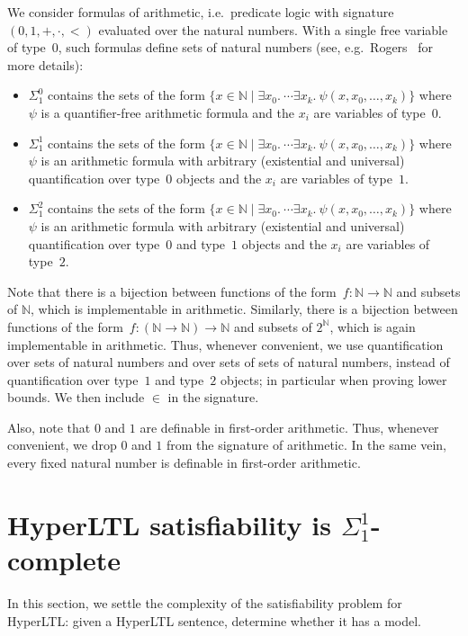 \documentclass[dvipsnames,10pt,a4paper]{amsart}
\theoremstyle{definition}
\theoremstyle{remark}
\newcommand{\set}[1]{\{#1\}}
\newcommand{\nats}{\mathbb{N}}
\newcommand{\pow}[1]{2^{#1}}
\newcommand{\hyltl}{{HyperLTL}\xspace}
\begin{document}
We consider formulas of arithmetic, i.e.\ predicate logic with signature~$(0,1, +, \cdot, <)$ evaluated over the natural numbers. With a single free variable of type~$0$, such formulas define sets of natural numbers (see, e.g.\ Rogers~\cite{Rogers87} for more details):
\begin{itemize}
	\item $\Sigma_1^0$ contains the sets of the form $\set{x \in \nats \mid \exists x_0.\  \cdots \exists x_k.\ \psi(x, x_0, \ldots, x_k)}$ where $\psi$ is a quantifier-free arithmetic formula and the $x_i$ are variables of type~$0$. 
	\item $\Sigma_1^1$ contains the sets of the form $\set{x \in \nats \mid \exists x_0.\  \cdots \exists x_k.\ \psi(x, x_0, \ldots, x_k)}$ where $\psi$ is an arithmetic formula with arbitrary (existential and universal) quantification over type~$0$ objects and the $x_i$ are variables of type~$1$. 
	\item $\Sigma_1^2$ contains the sets of the form $\set{x \in \nats \mid \exists x_0.\  \cdots \exists x_k.\ \psi(x, x_0, \ldots, x_k)}$ where $\psi$ is an arithmetic formula with arbitrary (existential and universal) quantification over type~$0$ and type~$1$ objects and the $x_i$ are variables of type~$2$.
\end{itemize}
Note that there is a bijection between functions of the form~$f\colon \nats\rightarrow \nats$ and subsets of $\nats$, which is implementable in  arithmetic. 
Similarly, there is a bijection between functions of the form~$f \colon (\nats \rightarrow \nats)\rightarrow\nats$ and subsets of $\pow{\nats}$, which is again implementable in arithmetic.
Thus, whenever convenient, we use quantification over sets of natural numbers and over sets of sets of natural numbers, instead of quantification over type~$1$ and type~$2$ objects; in particular when proving lower bounds. We then include $\in$ in the signature. 

Also, note that $0$ and $1$ are definable in first-order arithmetic. 
Thus, whenever convenient, we drop $0$ and $1$ from the signature of arithmetic.
In the same vein, every fixed natural number is definable in first-order arithmetic.


\section{\texorpdfstring{\hyltl}{HyperLTL} satisfiability is \texorpdfstring{$\Sigma_1^1$}{Sigma11}-complete}
\label{sec:sat}
In this section, we settle the complexity of the satisfiability problem for HyperLTL:
given a \hyltl sentence, determine whether it has a model.
\end{document}
